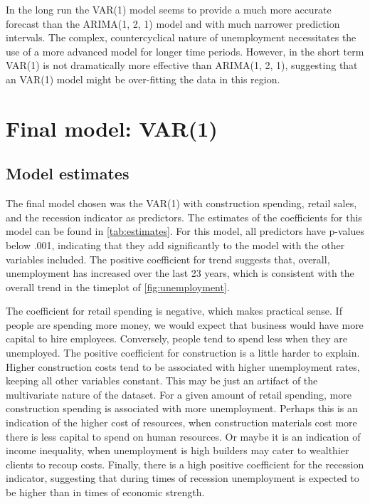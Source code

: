 \documentclass[twoside,twocolumn]{article}
\begin{document}
In the long run the VAR(1) model seems to provide a much more accurate forecast than the ARIMA(1, 2, 1) model and with much narrower prediction intervals. The complex, countercyclical nature of unemployment necessitates the use of a more advanced model for longer time periods. However, in the short term VAR(1) is not dramatically more effective than ARIMA(1, 2, 1), suggesting that an VAR(1) model might be over-fitting the data in this region.


 \section{Final model: VAR(1)}

 \subsection{Model estimates} \label{estimates}

The final model chosen was the VAR(1) with construction spending, retail sales, and the recession indicator as predictors.
 The estimates of the coefficients for this model can be found in \ref{tab:estimates}. For this model, all predictors have p-values below .001, indicating that they add significantly to the model with the other variables included. The positive coefficient for trend suggests that, overall, unemployment has increased over the last 23 years, which is consistent with the overall trend in the timeplot of \ref{fig:unemployment}.


The coefficient for retail spending is negative, which makes practical sense. If people are spending more money, we would expect that business would have more capital to hire employees. Conversely, people tend to spend less when they are unemployed.  The positive coefficient for construction is a little harder to explain. Higher construction costs tend to be associated with higher unemployment rates, keeping all other variables constant.  This may be just an artifact of the multivariate nature of the dataset. For a given amount of retail spending, more construction spending is associated with more unemployment. Perhaps this is an indication of the higher cost of resources, when construction materials cost more there is less capital to spend on human resources. Or maybe it is an indication of income inequality, when unemployment is high builders may cater to wealthier clients to recoup costs. Finally, there is a high positive coefficient for the recession indicator, suggesting that during times of recession unemployment is expected to be higher than in times of economic strength.
\end{document}
